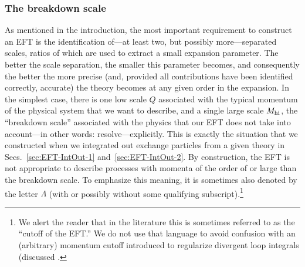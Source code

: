 \subsubsection{The breakdown scale}

As mentioned in the introduction, the most important requirement to construct 
an EFT is the identification of---at least two, but possibly more---separated 
scales, ratios of which are used to extract a small expansion parameter.  The 
better the scale separation, the smaller this parameter becomes, and 
consequently the better the more precise (and, provided all contributions have 
been identified correctly, accurate) the theory becomes at any given order in 
the expansion.  In the simplest case, there is one low scale $Q$ 
associated with the typical momentum of the physical system that we want to 
describe, and a single large scale $M_{\rm hi}$, the ``breakdown scale'' associated 
with the physics that our EFT does not take into account---in other words: 
resolve---explicitly.  This is exactly the situation that we constructed when we 
integrated out exchange particles from a given theory in 
Secs.~\ref{sec:EFT-IntOut-1} and~\ref{sec:EFT-IntOut-2}.  By construction, the 
EFT is not appropriate to describe processes with momenta of the order of or 
large than the breakdown scale.  To emphasize this meaning, it is sometimes also 
denoted by the letter $\Lambda$ (with or possibly without some qualifying 
subscript).\footnote{We alert the reader that in the literature this is 
sometimes referred to as the ``cutoff of the EFT.''  We do not use that language 
to avoid confusion with an (arbitrary) momentum cutoff introduced to regularize 
divergent loop integrals (discussed .}


